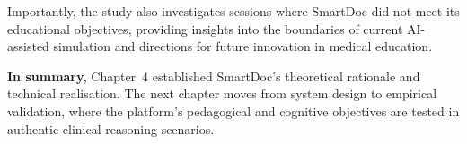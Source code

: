 Importantly, the study also investigates sessions where SmartDoc did not meet its educational objectives, providing insights into the boundaries of current AI-assisted simulation and directions for future innovation in medical education.

\medskip
\noindent
\textbf{In summary,} Chapter~4 established SmartDoc’s theoretical rationale and technical realisation. The next chapter moves from system design to empirical validation, where the platform’s pedagogical and cognitive objectives are tested in authentic clinical reasoning scenarios.
